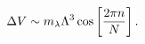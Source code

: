 \begin{equation} \label{pot}    
\Delta V \sim  m_\lambda \Lambda^3 \cos \left[ { 2 \pi n \over N}     
\right].    
\end{equation} 
